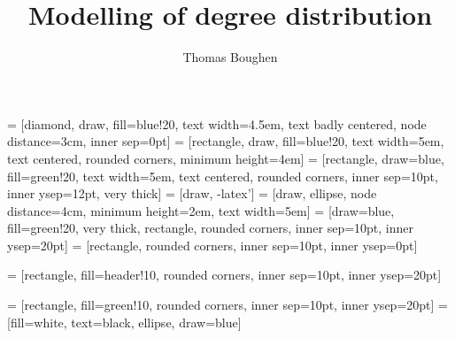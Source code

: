 \documentclass[portrait,a1,posterdraft]{a0poster}\usepackage[]{graphicx}\usepackage[]{xcolor}
\title{Modelling of degree distribution }
\author{Thomas Boughen}
\date{}
\begin{document}
  \pagestyle{empty}
  \selectfont



  
  \maketitle
  
  
  
  
  
  
   = [diamond, draw, fill=blue!20, text width=4.5em, text badly centered, node distance=3cm, inner sep=0pt]
   = [rectangle, draw, fill=blue!20, text width=5em, text centered, rounded corners, minimum height=4em]
   = [rectangle, draw=blue, fill=green!20, text width=5em, text centered, rounded corners, inner sep=10pt, inner ysep=12pt, very thick]
   = [draw, -latex']
   = [draw, ellipse, node distance=4cm, minimum height=2em, text width=5em]
   = [draw=blue, fill=green!20, very thick, rectangle, rounded corners, inner sep=10pt, inner ysep=20pt]
   = [rectangle, rounded corners, inner sep=10pt, inner ysep=0pt]
  
   = [rectangle, fill=header!10, rounded corners, inner sep=10pt, inner ysep=20pt]
  
   = [rectangle, fill=green!10, rounded corners, inner sep=10pt, inner ysep=20pt]
   = [fill=white, text=black, ellipse, draw=blue]
  
  
  
  
  \small
  
\end{document}
